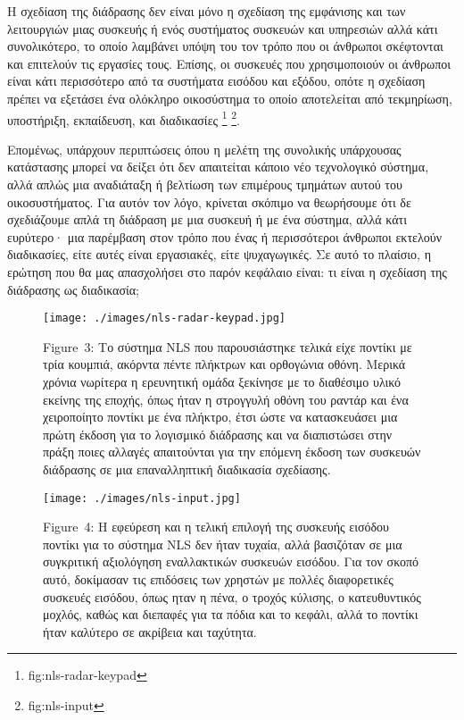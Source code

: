 \documentclass[
]{article}
\begin{document}
Η σχεδίαση της διάδρασης δεν είναι μόνο η σχεδίαση της εμφάνισης και των
λειτουργιών μιας συσκευής ή ενός συστήματος συσκευών και υπηρεσιών αλλά
κάτι συνολικότερο, το οποίο λαμβάνει υπόψη του τον τρόπο που οι άνθρωποι
σκέφτονται και επιτελούν τις εργασίες τους. Επίσης, οι συσκευές που
χρησιμοποιούν οι άνθρωποι είναι κάτι περισσότερο από τα συστήματα
εισόδου και εξόδου, οπότε η σχεδίαση πρέπει να εξετάσει ένα ολόκληρο
οικοσύστημα το οποίο αποτελείται από τεκμηρίωση, υποστήριξη, εκπαίδευση,
και διαδικασίες \footnote{fig:nls-radar-keypad} \footnote{fig:nls-input}.

Επομένως, υπάρχουν περιπτώσεις όπου η μελέτη της συνολικής υπάρχουσας
κατάστασης μπορεί να δείξει ότι δεν απαιτείται κάποιο νέο τεχνολογικό
σύστημα, αλλά απλώς μια αναδιάταξη ή βελτίωση των επιμέρους τμημάτων
αυτού του οικοσυστήματος. Για αυτόν τον λόγο, κρίνεται σκόπιμο να
θεωρήσουμε ότι δε σχεδιάζουμε απλά τη διάδραση με μια συσκευή ή με ένα
σύστημα, αλλά κάτι ευρύτερο· μια παρέμβαση στον τρόπο που ένας ή
περισσότεροι άνθρωποι εκτελούν διαδικασίες, είτε αυτές είναι εργασιακές,
είτε ψυχαγωγικές. Σε αυτό το πλαίσιο, η ερώτηση που θα μας απασχολήσει
στο παρόν κεφάλαιο είναι: τι είναι η σχεδίαση της διάδρασης ως
διαδικασία;

\leavevmode{}%
\begin{figure}
\hypertarget{fig:nls-radar-keypad}{%
\centering
\texttt{[image: ./images/nls-radar-keypad.jpg]}
\caption{Figure~3: Το σύστημα NLS που παρουσιάστηκε τελικά είχε ποντίκι
με τρία κουμπιά, ακόρντα πέντε πλήκτρων και ορθογώνια οθόνη. Μερικά
χρόνια νωρίτερα η ερευνητική ομάδα ξεκίνησε με το διαθέσιμο υλικό
εκείνης της εποχής, όπως ήταν η στρογγυλή οθόνη του ραντάρ και ένα
χειροποίητο ποντίκι με ένα πλήκτρο, έτσι ώστε να κατασκευάσει μια πρώτη
έκδοση για το λογισμικό διάδρασης και να διαπιστώσει στην πράξη ποιες
αλλαγές απαιτούνται για την επόμενη έκδοση των συσκευών διάδρασης σε μια
επαναλληπτική διαδικασία σχεδίασης.}\label{fig:nls-radar-keypad}
}
\end{figure}

\leavevmode{}%
\begin{figure}
\hypertarget{fig:nls-input}{%
\centering
\texttt{[image: ./images/nls-input.jpg]}
\caption{Figure~4: Η εφεύρεση και η τελική επιλογή της συσκευής εισόδου
ποντίκι για το σύστημα NLS δεν ήταν τυχαία, αλλά βασιζόταν σε μια
συγκριτική αξιολόγηση εναλλακτικών συσκευών εισόδου. Για τον σκοπό αυτό,
δοκίμασαν τις επιδόσεις των χρηστών με πολλές διαφορετικές συσκευές
εισόδου, όπως ηταν η πένα, ο τροχός κύλισης, ο κατευθυντικός μοχλός,
καθώς και διεπαφές για τα πόδια και το κεφάλι, αλλά το ποντίκι ήταν
καλύτερο σε ακρίβεια και ταχύτητα.}\label{fig:nls-input}
}
\end{figure}
\end{document}
